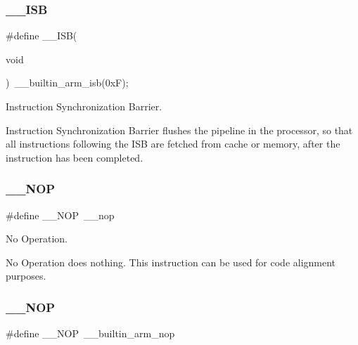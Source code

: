 \subsubsection{\texorpdfstring{\+\_\+\+\_\+\+I\+SB}{\_\_ISB}\hspace{0.1cm}{\footnotesize\ttfamily [2/2]}}
{\footnotesize\ttfamily \#define \+\_\+\+\_\+\+I\+SB(\begin{DoxyParamCaption}\item[{}]{void }\end{DoxyParamCaption})~\+\_\+\+\_\+builtin\+\_\+arm\+\_\+isb(0x\+F);}



Instruction Synchronization Barrier. 

Instruction Synchronization Barrier flushes the pipeline in the processor, so that all instructions following the I\+SB are fetched from cache or memory, after the instruction has been completed. \mbox{\label{group___c_m_s_i_s___core___instruction_interface_gabd585ddc865fb9b7f2493af1eee1a572}} 
\subsubsection{\texorpdfstring{\+\_\+\+\_\+\+N\+OP}{\_\_NOP}\hspace{0.1cm}{\footnotesize\ttfamily [1/3]}}
{\footnotesize\ttfamily \#define \+\_\+\+\_\+\+N\+OP~\+\_\+\+\_\+nop}



No Operation. 

No Operation does nothing. This instruction can be used for code alignment purposes. \mbox{\label{group___c_m_s_i_s___core___instruction_interface_gabd585ddc865fb9b7f2493af1eee1a572}} 
\subsubsection{\texorpdfstring{\+\_\+\+\_\+\+N\+OP}{\_\_NOP}\hspace{0.1cm}{\footnotesize\ttfamily [2/3]}}
{\footnotesize\ttfamily \#define \+\_\+\+\_\+\+N\+OP~\+\_\+\+\_\+builtin\+\_\+arm\+\_\+nop}



